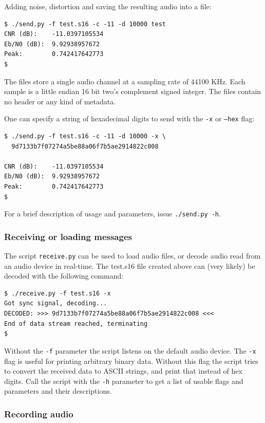 \documentclass[a4paper]{article}
\begin{document}
Adding noise, distortion and saving the resulting audio into a file:

\begin{lstlisting}
$ ./send.py -f test.s16 -c -11 -d 10000 test
CNR (dB):    -11.0397105534
Eb/N0 (dB):  9.92938957672
Peak:        0.742417642773
$
\end{lstlisting}

The files store a single audio channel at a sampling rate of 44100 KHz. 
Each sample is a little endian 16 bit two's complement signed integer. 
The files contain no header or any kind of metadata.

One can specify a string of hexadecimal digits to send with the 
\texttt{-x} or \texttt{--hex} flag:

\begin{lstlisting}
$ ./send.py -f test.s16 -c -11 -d 10000 -x \
  9d7133b7f07274a5be88a06f7b5ae2914822c008

CNR (dB):    -11.0397105534
Eb/N0 (dB):  9.92938957672
Peak:        0.742417642773
$
\end{lstlisting}

For a brief description of usage and parameters, issue 
\texttt{./send.py -h}.

\subsubsection{Receiving or loading messages}

The script \texttt{receive.py} can be used to load audio files, or 
decode audio read from an audio device in real-time. The test.s16 file 
created above can (very likely) be decoded with the following 
command:

\begin{lstlisting}
$ ./receive.py -f test.s16 -x
Got sync signal, decoding... 
DECODED: >>> 9d7133b7f07274a5be88a06f7b5ae2914822c008 <<<
End of data stream reached, terminating
$
\end{lstlisting}

Without the \texttt{-f} parameter the script listens on the default 
audio device. The \texttt{-x} flag is useful for printing arbitrary 
binary data. Without this flag the script tries to convert the received 
data to ASCII strings, and print that instead of hex digits. Call the 
script with the \texttt{-h} parameter to get a list of usable flags 
and parameters and their descriptions.

\subsubsection{Recording audio}
\end{document}
